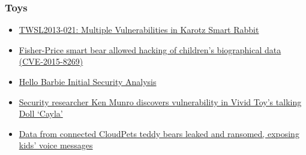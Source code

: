 \hypertarget{toys}{%
\subsubsection{Toys}\label{toys}}

\begin{itemize}
\tightlist
\item
  \href{https://www.trustwave.com/Resources/Security-Advisories/Advisories/TWSL2013-021/?fid=3871}{TWSL2013-021:
  Multiple Vulnerabilities in Karotz Smart Rabbit}
\item
  \href{https://www.theguardian.com/technology/2016/feb/02/fisher-price-mattel-smart-toy-bear-data-hack-technology}{Fisher-Price
  smart bear allowed hacking of children's biographical data
  (CVE-2015-8269)}
\item
  \href{https://static1.squarespace.com/static/543effd8e4b095fba39dfe59/t/56a66d424bf1187ad34383b2/1453747529070/HelloBarbieSecurityAnalysis.pdf}{Hello
  Barbie Initial Security Analysis}
\item
  \href{http://www.techworm.net/2015/01/vivid-toys-cayla-talking-doll-vulnerable-hacking-says-security-researcher.html}{Security
  researcher Ken Munro discovers vulnerability in Vivid Toy's talking
  Doll `Cayla'}
\item
  \href{https://www.troyhunt.com/data-from-connected-cloudpets-teddy-bears-leaked-and-ransomed-exposing-kids-voice-messages/}{Data
  from connected CloudPets teddy bears leaked and ransomed, exposing
  kids' voice messages}
\end{itemize}

